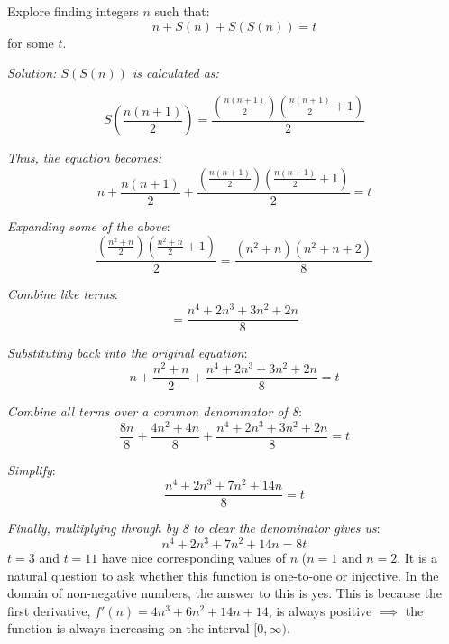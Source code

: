 \documentclass{article}
\begin{document}
\begin{enumerate}
    Explore finding integers \( n \) such that:
    \[
    n + S(n) + S(S(n)) = t
    \]
    for some $t$.

    \textit{Solution: \( S(S(n)) \) is calculated as:}
    
    \[
    S\left(\frac{n(n + 1)}{2}\right) = \frac{\left(\frac{n(n + 1)}{2}\right)\left(\frac{n(n + 1)}{2} + 1\right)}{2}
    \]
    
    \textit{Thus, the equation becomes:
    \[
    n + \frac{n(n + 1)}{2} + \frac{\left(\frac{n(n + 1)}{2}\right)\left(\frac{n(n + 1)}{2} + 1\right)}{2} = t
    \]
    }

    \textit{Expanding some of the above}:
    \[
    \frac{\left(\frac{n^2 + n}{2}\right)\left(\frac{n^2 + n}{2} + 1\right)}{2} = \frac{(n^2 + n)(n^2 + n + 2)}{8}
    \]
    
    \textit{Combine like terms}:
    \[
    = \frac{n^4 + 2n^3 + 3n^2 + 2n}{8}
    \]
    
    \textit{Substituting back into the original equation}:
    \[
    n + \frac{n^2 + n}{2} + \frac{n^4 + 2n^3 + 3n^2 + 2n}{8} = t
    \]
    
    \textit{Combine all terms over a common denominator of 8}:
    \[
    \frac{8n}{8} + \frac{4n^2 + 4n}{8} + \frac{n^4 + 2n^3 + 3n^2 + 2n}{8} = t
    \]
    
    \textit{Simplify}:
    \[
    \frac{n^4 + 2n^3 + 7n^2 + 14n}{8} = t
    \]
    
    \textit{Finally, multiplying through by 8 to clear the denominator gives us}:
    \[
    n^4 + 2n^3 + 7n^2 + 14n = 8t
    \]
    $t = 3$ and $t = 11$ have nice corresponding values of $n$ ($n=1 \text{ and } n=2$. It is a natural question to ask whether this function is one-to-one or injective. In the domain of non-negative numbers, the answer to this is yes. This is because the first derivative, $f'(n) = 4n^3 + 6n^2 + 14n + 14$, is always positive $\implies$ the function is always increasing on the interval $[0, \infty)$. 

    \end{enumerate}
    
\end{document}
